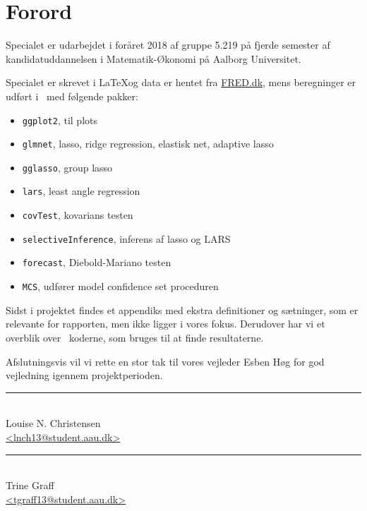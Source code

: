\chapter{Forord} \label{ch:forord}
Specialet er udarbejdet i foråret 2018 af gruppe 5.219 på fjerde semester af kandidatuddannelsen i Matematik-Økonomi på Aalborg Universitet.

Specialet er skrevet i \LaTeX og data er hentet fra \url{FRED.dk}, mens beregninger er udført i \Rlang ~med følgende pakker:
%
\begin{itemize}
	\item \texttt{ggplot2}, til plots
	\item \texttt{glmnet}, lasso, ridge regression, elastisk net, adaptive lasso
	\item \texttt{gglasso}, group lasso
	\item \texttt{lars}, least angle regression
	\item \texttt{covTest}, kovarians testen
	\item \texttt{selectiveInference}, inferens af lasso og LARS
	\item \texttt{forecast}, Diebold-Mariano testen
	\item \texttt{MCS}, udfører model confidence set proceduren
\end{itemize}
%
Sidst i projektet findes et appendiks med ekstra definitioner og sætninger, som er relevante for rapporten, men ikke ligger i vores fokus.
Derudover har vi et overblik over \Rlang ~koderne, som bruges til at finde resultaterne. 

Afslutningsvis vil vi rette en stor tak til vores vejleder Esben Høg for god vejledning igennem projektperioden.

%
%
\vfill
%

\begin{center}
\begin{minipage}[b]{0.45\textwidth}
 \centering
 \rule{\textwidth}{0.5pt}\\
  Louise N. Christensen\\
 {\footnotesize\ttfamily \href{mailto:lnch13@student.aau.dk}{<lnch13@student.aau.dk>}}
\end{minipage}
\hfill
\begin{minipage}[b]{0.45\textwidth}
 \centering
 \rule{\textwidth}{0.5pt}\\
  Trine Graff\\
 {\footnotesize\ttfamily \href{mailto:tgraff13@student.aau.dk}{<tgraff13@student.aau.dk>}}
\end{minipage}
\end{center}

